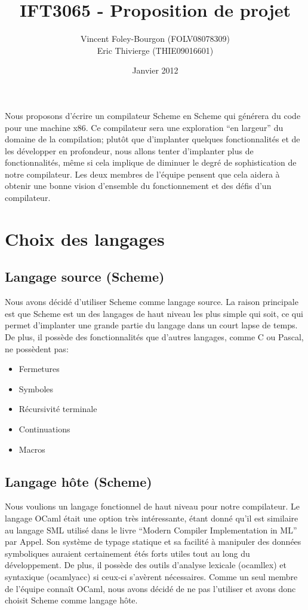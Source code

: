 \documentclass[11pt]{article}
\begin{document}
\title{IFT3065 - Proposition de projet}
\date{Janvier 2012}
\author{Vincent Foley-Bourgon (FOLV08078309) \\
Eric Thivierge (THIE09016601)}
\maketitle

\abstract

Nous proposons d'écrire un compilateur Scheme en Scheme qui générera
du code pour une machine x86.  Ce compilateur sera une exploration
``en largeur'' du domaine de la compilation; plutôt que d'implanter
quelques fonctionnalités et de les développer en profondeur, nous
allons tenter d'implanter plus de fonctionnalités, même si cela
implique de diminuer le degré de sophistication de notre compilateur.
Les deux membres de l'équipe pensent que cela aidera à obtenir une
bonne vision d'ensemble du fonctionnement et des défis d'un
compilateur.

\section{Choix des langages}

\subsection{Langage source (Scheme)}

Nous avons décidé d'utiliser Scheme comme langage source.  La raison
principale est que Scheme est un des langages de haut niveau les plus
simple qui soit, ce qui permet d'implanter une grande partie du
langage dans un court lapse de temps.  De plus, il possède des
fonctionnalités que d'autres langages, comme C ou Pascal, ne possèdent
pas:

\begin{itemize}
\item Fermetures
\item Symboles
\item Récursivité terminale
\item Continuations
\item Macros
\end{itemize}


\subsection{Langage hôte (Scheme)}

Nous voulions un langage fonctionnel de haut niveau pour notre
compilateur.  Le langage OCaml était une option très intéressante,
étant donné qu'il est similaire au langage SML utilisé dans le livre
``Modern Compiler Implementation in ML'' par Appel.  Son système de
typage statique et sa facilité à manipuler des données symboliques
auraient certainement étés forts utiles tout au long du développement.
De plus, il possède des outils d'analyse lexicale (ocamllex) et
syntaxique (ocamlyacc) si ceux-ci s'avèrent nécessaires. Comme un seul
membre de l'équipe connaît OCaml, nous avons décidé de ne pas
l'utiliser et avons donc choisit Scheme comme langage hôte.
\end{document}
